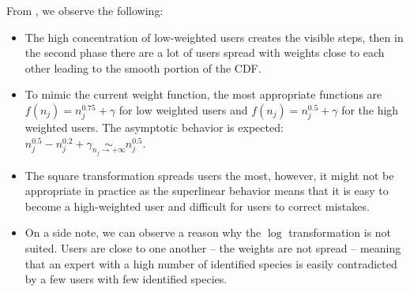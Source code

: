 From , we observe the following:
\begin{itemize}
    \item The high concentration of low-weighted users creates the visible steps, then in the second phase there are a lot of users spread with weights close to each other leading to the smooth portion of the CDF.
    \item To mimic the current weight function, the most appropriate functions are $f(n_j)=n_j^{0.75}+\gamma$ for low weighted users and $f(n_j)=n_j^{0.5}+\gamma$ for the high weighted users. The asymptotic behavior is expected: $n_j^{0.5} - n_j^{0.2}+\gamma  \underset{n_j\rightarrow +\infty}{\sim} n_j^{0.5}$.
    \item The square transformation spreads users the most, however, it might not be appropriate in practice as the superlinear behavior means that it is easy to become a high-weighted user and difficult for users to correct mistakes.
    \item On a side note, we can observe a reason why the $\log$ transformation is not suited. Users are close to one another -- the weights are not spread -- meaning that an expert with a high number of identified species is easily contradicted by a few users with few identified species.
\end{itemize}

